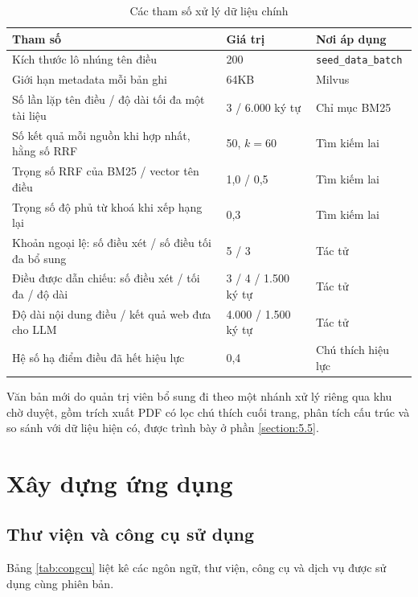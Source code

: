 \documentclass[../DoAn.tex]{subfiles}
\begin{document}
\begin{table}[H]
\centering
\caption{Các tham số xử lý dữ liệu chính}
\label{tab:thamso_dulieu}
\begin{tabular}{|L{6.6cm}|L{3.0cm}|L{3.8cm}|}
\hline
\textbf{Tham số} & \textbf{Giá trị} & \textbf{Nơi áp dụng} \\ \hline
Kích thước lô nhúng tên điều & 200 & \texttt{seed\_data\_batch} \\ \hline
Giới hạn metadata mỗi bản ghi & 64KB & Milvus \\ \hline
Số lần lặp tên điều / độ dài tối đa một tài liệu & 3 / 6.000 ký tự & Chỉ mục BM25 \\ \hline
Số kết quả mỗi nguồn khi hợp nhất, hằng số RRF & 50, $k = 60$ & Tìm kiếm lai \\ \hline
Trọng số RRF của BM25 / vector tên điều & 1,0 / 0,5 & Tìm kiếm lai \\ \hline
Trọng số độ phủ từ khoá khi xếp hạng lại & 0,3 & Tìm kiếm lai \\ \hline
Khoản ngoại lệ: số điều xét / số điều tối đa bổ sung & 5 / 3 & Tác tử \\ \hline
Điều được dẫn chiếu: số điều xét / tối đa / độ dài & 3 / 4 / 1.500 ký tự & Tác tử \\ \hline
Độ dài nội dung điều / kết quả web đưa cho LLM & 4.000 / 1.500 ký tự & Tác tử \\ \hline
Hệ số hạ điểm điều đã hết hiệu lực & 0,4 & Chú thích hiệu lực \\ \hline
\end{tabular}
\end{table}

Văn bản mới do quản trị viên bổ sung đi theo một nhánh xử lý riêng qua khu chờ duyệt, gồm trích xuất PDF có lọc chú thích cuối trang, phân tích cấu trúc và so sánh với dữ liệu hiện có, được trình bày ở phần \ref{section:5.5}.

\section{Xây dựng ứng dụng}
\label{section:4.3}

\subsection{Thư viện và công cụ sử dụng}
Bảng \ref{tab:congcu} liệt kê các ngôn ngữ, thư viện, công cụ và dịch vụ được sử dụng cùng phiên bản.
\end{document}
